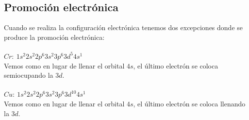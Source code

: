 \documentclass[12pt]{article}
\begin{document}
	\subsection{Promoción electrónica}
	Cuando se realiza la configuración electrónica tenemos dos excepciones donde se produce la promoción electrónica:\\
	\\
	$Cr: \ 1s^2 2s^2 2p^6 3s^2 3p^6 3d^5 4s^1$\\
	Vemos como en lugar de llenar el orbital $4s$, el último electrón se coloca semiocupando la $3d$.\\
	\\
	$Cu: \ 1s^2 2s^2 2p^6 3s^2 3p^6 3d^{10} 4s^1$\\
	Vemos como en lugar de llenar el orbital $4s$, el último electrón se coloca llenando la $3d$.
		
	
	
	
	
\end{document}
